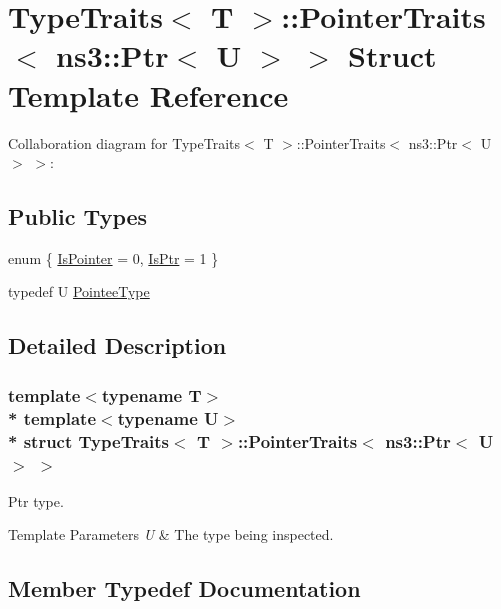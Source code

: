 \hypertarget{structTypeTraits_1_1PointerTraits_3_01ns3_1_1Ptr_3_01U_01_4_01_4}{}\section{Type\+Traits$<$ T $>$\+:\+:Pointer\+Traits$<$ ns3\+:\+:Ptr$<$ U $>$ $>$ Struct Template Reference}
\label{structTypeTraits_1_1PointerTraits_3_01ns3_1_1Ptr_3_01U_01_4_01_4}


Collaboration diagram for Type\+Traits$<$ T $>$\+:\+:Pointer\+Traits$<$ ns3\+:\+:Ptr$<$ U $>$ $>$\+:
\subsection*{Public Types}
\begin{DoxyCompactItemize}
\item 
enum \{ \hyperlink{structTypeTraits_1_1PointerTraits_3_01ns3_1_1Ptr_3_01U_01_4_01_4_a54d8da47ad5bb02b8af0b2a95d5a3597a65017526e1da76dc0083f526b9263ede}{Is\+Pointer} = 0, 
\hyperlink{structTypeTraits_1_1PointerTraits_3_01ns3_1_1Ptr_3_01U_01_4_01_4_a54d8da47ad5bb02b8af0b2a95d5a3597a0c3ce85112b5ec9aed69e63e6abe7b66}{Is\+Ptr} = 1
 \}
\item 
typedef U \hyperlink{structTypeTraits_1_1PointerTraits_3_01ns3_1_1Ptr_3_01U_01_4_01_4_aab9f49309d936b304922e6a80083126b}{Pointee\+Type}
\end{DoxyCompactItemize}


\subsection{Detailed Description}
\subsubsection*{template$<$typename T$>$\\*
template$<$typename U$>$\\*
struct Type\+Traits$<$ T $>$\+::\+Pointer\+Traits$<$ ns3\+::\+Ptr$<$ U $>$ $>$}

Ptr type. 
\begin{DoxyTemplParams}{Template Parameters}
{\em U} & The type being inspected. \\
\hline
\end{DoxyTemplParams}


\subsection{Member Typedef Documentation}
